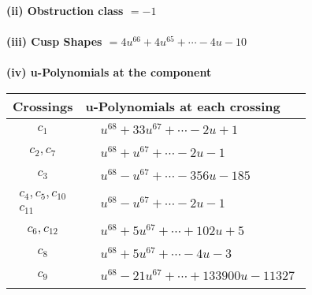 \documentclass[1p]{elsarticle_modified}
\theoremstyle{definition}
\begin{document}
\flushleft \textbf{(ii) Obstruction class $= -1$}\\~\\
\flushleft \textbf{(iii) Cusp Shapes $= 4 u^{66}+4 u^{65}+\cdots-4 u-10$}\\~\\
\newpage\renewcommand{\arraystretch}{1}
\flushleft \textbf{(iv) u-Polynomials at the component}\newline \\
\begin{tabular}{m{50pt}|m{274pt}}
Crossings & \hspace{64pt}u-Polynomials at each crossing \\
\hline $$\begin{aligned}c_{1}\end{aligned}$$&$\begin{aligned}
&u^{68}+33 u^{67}+\cdots-2 u+1
\end{aligned}$\\
\hline $$\begin{aligned}c_{2},c_{7}\end{aligned}$$&$\begin{aligned}
&u^{68}+u^{67}+\cdots-2 u-1
\end{aligned}$\\
\hline $$\begin{aligned}c_{3}\end{aligned}$$&$\begin{aligned}
&u^{68}- u^{67}+\cdots-356 u-185
\end{aligned}$\\
\hline $$\begin{aligned}c_{4},c_{5},c_{10}\\c_{11}\end{aligned}$$&$\begin{aligned}
&u^{68}- u^{67}+\cdots-2 u-1
\end{aligned}$\\
\hline $$\begin{aligned}c_{6},c_{12}\end{aligned}$$&$\begin{aligned}
&u^{68}+5 u^{67}+\cdots+102 u+5
\end{aligned}$\\
\hline $$\begin{aligned}c_{8}\end{aligned}$$&$\begin{aligned}
&u^{68}+5 u^{67}+\cdots-4 u-3
\end{aligned}$\\
\hline $$\begin{aligned}c_{9}\end{aligned}$$&$\begin{aligned}
&u^{68}-21 u^{67}+\cdots+133900 u-11327
\end{aligned}$\\
\hline
\end{tabular}\\~\\
\end{document}
